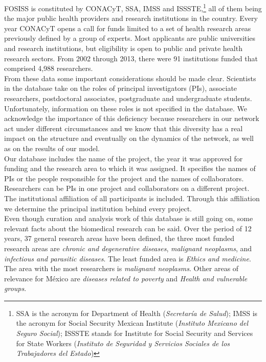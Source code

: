 \documentclass{bmcart}
\begin{document}
FOSISS is constituted by CONACyT, SSA, IMSS and ISSSTE,\footnote{SSA
  is the acronym for Department of Health (\emph{Secretar\'ia de
    Salud}); IMSS is the acronym for Social Security Mexican Institute
  (\emph{Instituto Mexicano del Seguro Social}); ISSSTE stands for
  Institute for Social Security and Services for State Workers
  (\emph{Instituto de Seguridad y Servicios Sociales de los
    Trabajadores del Estado})} all of them being the major public
health providers and research institutions in the country. Every year
CONACyT opens a call for funds limited to a set of health research
areas previously defined by a group of experts. Most applicants are
public universities and research institutions, but eligibility is open
to public and private health research sectors.  From 2002 through
2013, there were 91 institutions funded that comprised 4,988
researchers.\\

From these data some important considerations should be made
clear. Scientists in the database take on the roles of principal
investigators (PIs), associate researchers, postdoctoral associates,
postgraduate and undergraduate students.  Unfortunately, information
on these roles is not specified in the database.  We acknowledge the
importance of this deficiency because researchers in our network act
under different circumstances and we know that this diversity has a
real impact on the structure and eventually on the dynamics of the
network, as well as on the results of our model.\\

Our database includes the name of the project, the year it was
approved for funding and the research area to which it was
assigned. It specifies the names of PIs or the people responsible for
the project and the names of collaborators.  Researchers can be PIs in
one project and collaborators on a different project. The
institutional affiliation of all participants is included. Through
this affiliation we determine the principal institution behind every
project.\\

Even though curation and analysis work of this database is still going
on, some relevant facts about the biomedical research can be
said. Over the period of 12 years, 37 general research areas have been
defined, the three most funded research areas are \emph{chronic and
  degenerative diseases}, \emph{malignant neoplasms}, and
\emph{infectious and parasitic diseases}. The least funded area is
\emph{Ethics and medicine}. The area with the most researchers is
\emph{malignant neoplasms}. Other areas of relevance for M\'exico are
\emph{diseases related to poverty} and \emph{Health and vulnerable
  groups}. \\
\end{document}
